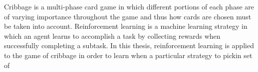 

Cribbage is a multi-phase card game in which different portions of each phase
are of varying importance throughout the game
and thus how cards are chosen must be taken into account.
%
Reinforcement learning is a machine learning strategy in which an agent learns
to accomplish a task by collecting rewards when successfully completing a
subtask.
%
In this thesis,
reinforcement learning is applied to the game of cribbage
in order to learn when a particular strategy to pickin
set of
